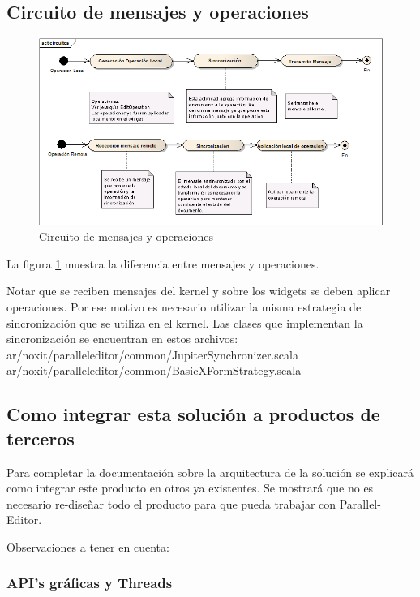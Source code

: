 \documentclass[12pt,a4paper]{article}
\begin{document}
\subsection{Circuito de mensajes y operaciones}

	\begin{figure}[!ht]
		\begin{center}
			\includegraphics[width=14cm]{circuitos-mensajes.png}
			\caption{\label{circuitos-mensajes} Circuito de mensajes y operaciones }
		\end{center}
	\end{figure}


La figura \ref{circuitos-mensajes} muestra la diferencia entre mensajes y operaciones.

Notar que se reciben mensajes del kernel y sobre los widgets se deben aplicar operaciones. Por ese motivo es necesario 
utilizar la misma estrategia de sincronización que se utiliza en el kernel. Las clases que implementan la sincronización se 
encuentran en estos archivos:
ar/noxit/paralleleditor/common/JupiterSynchronizer.scala
ar/noxit/paralleleditor/common/BasicXFormStrategy.scala

\subsection{Como integrar esta solución a productos de terceros}
Para completar la documentación sobre la arquitectura de la solución se explicará como integrar este producto en otros ya
existentes. Se mostrará que no es necesario re-diseñar todo el producto para que pueda trabajar con Parallel-Editor.

Observaciones a tener en cuenta:

\subsubsection{API’s gráficas y Threads}
\end{document}
